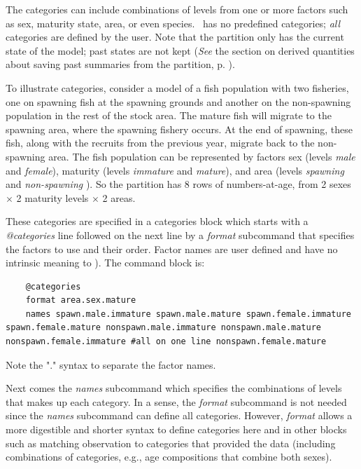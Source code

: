The categories can include combinations of levels from one or more factors such as sex, maturity state, area, or even species. \CNAME~has no predefined categories; \emph{all} categories are defined by the user. Note that the partition only has the current state of the model; past states are not kept (\textit{See} the section on derived quantities about saving past summaries from the partition, p. \pageref{sec:derived-quantities}).

To illustrate categories, consider a model of a fish population with two fisheries, one on spawning fish at the spawning grounds and another on the non-spawning population in the rest of the stock area. The mature fish will migrate to the spawning area, where the spawning fishery occurs. At the end of spawning, these fish, along with the recruits from the previous year, migrate back to the non-spawning area. The fish population can be represented  by factors sex (levels \textit{male} and \textit{female}), maturity (levels \textit{immature} and \textit{mature}), and area (levels \textit{spawning} and \textit{non-spawning} ). So the partition has 8 rows of numbers-at-age, from 2 sexes $\times$ 2 maturity levels $\times$ 2 areas.

These categories are specified in a categories block which starts with a \textit{@categories} line followed on the next line by a \textit{format} subcommand that specifies the factors to use and their order. Factor names are user defined and have no intrinsic meaning to \CNAME). The command block is:

{\small{\begin{lstlisting}
	@categories
	format area.sex.mature
	names spawn.male.immature spawn.male.mature spawn.female.immature spawn.female.mature nonspawn.male.immature nonspawn.male.mature nonspawn.female.immature #all on one line nonspawn.female.mature  
\end{lstlisting}}}  %

Note the "." syntax to separate the factor names.

Next comes the \textit{names} subcommand which specifies the combinations of levels that makes up each category. In a sense, the \textit{format} subcommand is not needed since the \textit{names} subcommand can define all categories. However, \textit{format} allows a more  digestible and shorter syntax to define categories here and in other blocks such as matching observation to categories that provided the data (including combinations of categories, e.g., age compositions that combine both sexes).

